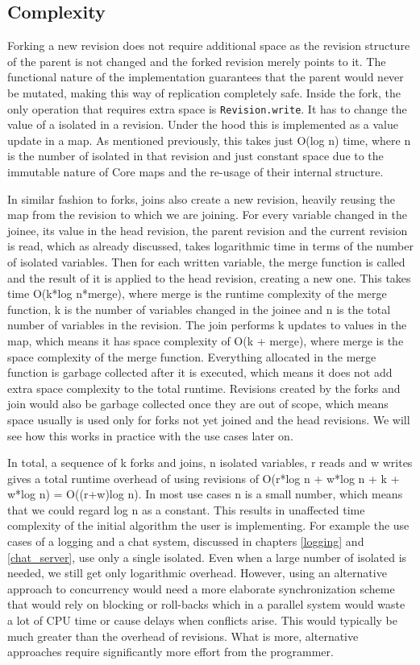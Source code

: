 \documentclass[12pt,twoside,notitlepage]{report}
\begin{document}
\subsection{Complexity}
Forking a new revision does not require additional space as the revision structure of the parent is not changed and the forked revision merely points to it. The functional nature of the implementation guarantees that the parent would never be mutated, making this way of replication completely safe. Inside the fork, the only operation that requires extra space is {\tt Revision.write}. It has to change the value of a isolated in a revision. Under the hood this is implemented as a value update in a map. As mentioned previously, this takes just O(log n) time, where n is the number of isolated in that revision and just constant space due to the immutable nature of Core maps and the re-usage of their internal structure. 

In similar fashion to forks, joins also create a new revision, heavily reusing the map from the revision to which we are joining. For every variable changed in the joinee, its value in the head revision, the parent revision and the current revision is read, which as already discussed, takes logarithmic time in terms of the number of isolated variables. Then for each written variable, the merge function is called and the result of it is applied to the head revision, creating a new one. This takes time O(k*log n*merge), where merge is the runtime complexity of the merge function, k is the number of variables changed in the joinee and n is the total number of variables in the revision. The join performs k updates to values in the map, which means it has space complexity of O(k + merge), where merge is the space complexity of the merge function. Everything allocated in the merge function is garbage collected after it is executed, which means it does not add extra space complexity to the total runtime. Revisions created by the forks and join would also be garbage collected once they are out of scope, which means space usually is used only for forks not yet joined and the head revisions. We will see how this works in practice with the use cases later on. 

In total, a sequence of k forks and joins, n isolated variables, r reads and w writes gives a total runtime overhead of using revisions of O(r*log n + w*log n + k + w*log n) = O((r+w)log n). In most use cases n is a small number, which means that we could regard log n as a constant. This results in unaffected time complexity of the initial algorithm the user is implementing. For example the use cases of a logging and a chat system, discussed in chapters \ref{logging} and \ref{chat_server}, use only a single isolated. Even when a large number of isolated is needed, we still get only logarithmic overhead. However, using an alternative approach to concurrency would need a more elaborate synchronization scheme that would rely on blocking or roll-backs which in a parallel system would waste a lot of CPU time or cause delays when conflicts arise. This would typically be much greater than the overhead of revisions. What is more, alternative approaches require significantly more effort from the programmer.
\end{document}
